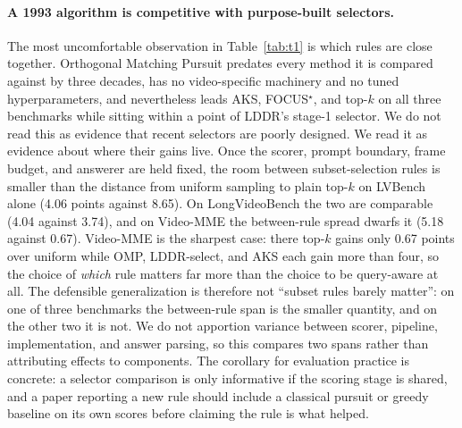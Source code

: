 \documentclass[11pt]{article}
\begin{document}
\paragraph{A 1993 algorithm is competitive with purpose-built selectors.}
The most uncomfortable observation in Table~\ref{tab:t1} is which rules are close together.
Orthogonal Matching Pursuit predates every method it is compared against by three decades, has no video-specific machinery and no tuned hyperparameters, and nevertheless leads AKS, FOCUS$^\star$, and top-$k$ on all three benchmarks while sitting within a point of LDDR's stage-1 selector.
We do not read this as evidence that recent selectors are poorly designed.
We read it as evidence about where their gains live.
Once the scorer, prompt boundary, frame budget, and answerer are held fixed, the room between subset-selection rules is smaller than the distance from uniform sampling to plain top-$k$ on LVBench alone (4.06 points against 8.65).
On LongVideoBench the two are comparable (4.04 against 3.74), and on Video-MME the between-rule spread dwarfs it (5.18 against 0.67).
Video-MME is the sharpest case: there top-$k$ gains only 0.67 points over uniform while OMP, LDDR-select, and AKS each gain more than four, so the choice of \emph{which} rule matters far more than the choice to be query-aware at all.
The defensible generalization is therefore not ``subset rules barely matter'': on one of three benchmarks the between-rule span is the smaller quantity, and on the other two it is not. We do not apportion variance between scorer, pipeline, implementation, and answer parsing, so this compares two spans rather than attributing effects to components.
The corollary for evaluation practice is concrete: a selector comparison is only informative if the scoring stage is shared, and a paper reporting a new rule should include a classical pursuit or greedy baseline on its own scores before claiming the rule is what helped.
\end{document}
